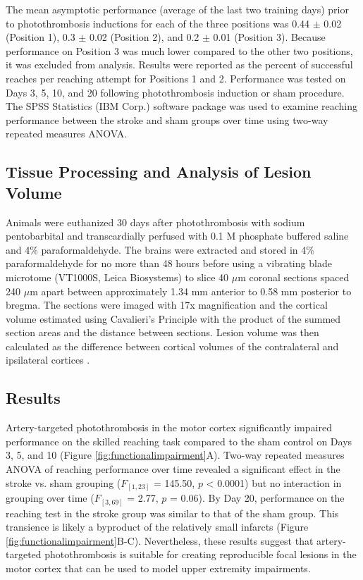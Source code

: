 The mean asymptotic performance (average of the last two training days) prior to photothrombosis inductions for each of the three positions was 0.44 $\pm$ 0.02 (Position 1), 0.3 $\pm$ 0.02 (Position 2), and 0.2 $\pm$ 0.01 (Position 3). Because performance on Position 3 was much lower compared to the other two positions, it was excluded from analysis. Results were reported as the percent of successful reaches per reaching attempt for Positions 1 and 2. Performance was tested on Days 3, 5, 10, and 20 following photothrombosis induction or sham procedure. The SPSS Statistics (IBM Corp.) software package was used to examine reaching performance between the stroke and sham groups over time using two-way repeated measures ANOVA.

\subsection{Tissue Processing and Analysis of Lesion Volume}

Animals were euthanized 30 days after photothrombosis with sodium pentobarbital and transcardially perfused with 0.1 M phosphate buffered saline and 4\% paraformaldehyde. The brains were extracted and stored in 4\% paraformaldehyde for no more than 48 hours before using a vibrating blade microtome (VT1000S, Leica Biosystems) to slice 40 $\mu$m coronal sections spaced 240 $\mu$m apart between approximately 1.34 mm anterior to 0.58 mm posterior to bregma. The sections were imaged with 17x magnification and the cortical volume estimated using Cavalieri's Principle \cite{Rosen:1990bf} with the product of the summed section areas and the distance between sections. Lesion volume was then calculated as the difference between cortical volumes of the contralateral and ipsilateral cortices \cite{Tennant:2011cx}.

\subsection{Results}

Artery-targeted photothrombosis in the motor cortex significantly impaired performance on the skilled reaching task compared to the sham control on Days 3, 5, and 10 (Figure \ref{fig:functionalimpairment}A). Two-way repeated measures ANOVA of reaching performance over time revealed a significant effect in the stroke vs. sham grouping ($F_{[1,23]}$ = 145.50, $p$ \textless{} 0.0001) but no interaction in grouping over time ($F_{[3,69]}$ = 2.77, $p$ = 0.06). By Day 20, performance on the reaching test in the stroke group was similar to that of the sham group. This transience is likely a byproduct of the relatively small infarcts (Figure \ref{fig:functionalimpairment}B-C). Nevertheless, these results suggest that artery-targeted photothrombosis is suitable for creating reproducible focal lesions in the motor cortex that can be used to model upper extremity impairments.

